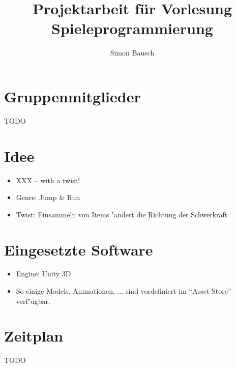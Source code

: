 \documentclass[landscape,compress,table]{beamer}
\title{Projektarbeit f\"ur Vorlesung Spieleprogrammierung}
\author{Simon Bausch}
\institute{Hochschule Aalen}
\begin{document}
\begin{frame}
	\titlepage
\end{frame}

\begin{frame}
	\tableofcontents
\end{frame}

\section{Gruppenmitglieder}
\begin{frame}
	TODO
\end{frame}

\section{Idee}
\begin{frame}
	\begin{itemize}
		\item
			XXX -- with a twist!
		\item
			Genre: Jump \& Run
		\item
			Twist: Einsammeln von Items "andert die
			Richtung der Schwerkraft
	\end{itemize}
\end{frame}

\section{Eingesetzte Software}
\begin{frame}
	\begin{itemize}
		\item
			Engine: Unity 3D
		\item
			So einige Models, Animationen, ...
			sind vordefiniert im ``Asset Store''
			verf"ugbar.
	\end{itemize}
\end{frame}

\section{Zeitplan}
\begin{frame}
	TODO
\end{frame}
\end{document}
